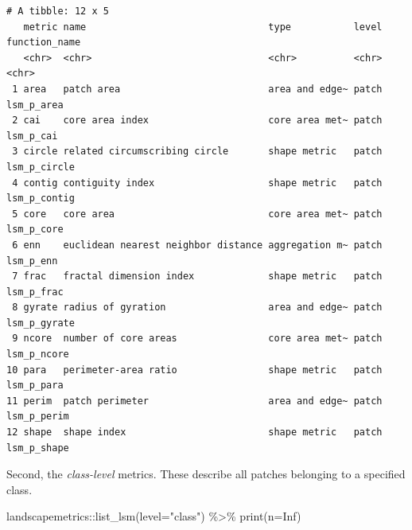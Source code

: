 \documentclass[
  letterpaper,
  DIV=11,
  numbers=noendperiod]{scrartcl}
\newenvironment{Shaded}{\begin{snugshade}}{\end{snugshade}}
\newcommand{\AttributeTok}[1]{\textcolor[rgb]{0.40,0.45,0.13}{#1}}
\newcommand{\ConstantTok}[1]{\textcolor[rgb]{0.56,0.35,0.01}{#1}}
\newcommand{\FunctionTok}[1]{\textcolor[rgb]{0.28,0.35,0.67}{#1}}
\newcommand{\NormalTok}[1]{\textcolor[rgb]{0.00,0.23,0.31}{#1}}
\newcommand{\SpecialCharTok}[1]{\textcolor[rgb]{0.37,0.37,0.37}{#1}}
\newcommand{\StringTok}[1]{\textcolor[rgb]{0.13,0.47,0.30}{#1}}
\begin{document}
\begin{verbatim}
# A tibble: 12 x 5
   metric name                                type           level function_name
   <chr>  <chr>                               <chr>          <chr> <chr>        
 1 area   patch area                          area and edge~ patch lsm_p_area   
 2 cai    core area index                     core area met~ patch lsm_p_cai    
 3 circle related circumscribing circle       shape metric   patch lsm_p_circle 
 4 contig contiguity index                    shape metric   patch lsm_p_contig 
 5 core   core area                           core area met~ patch lsm_p_core   
 6 enn    euclidean nearest neighbor distance aggregation m~ patch lsm_p_enn    
 7 frac   fractal dimension index             shape metric   patch lsm_p_frac   
 8 gyrate radius of gyration                  area and edge~ patch lsm_p_gyrate 
 9 ncore  number of core areas                core area met~ patch lsm_p_ncore  
10 para   perimeter-area ratio                shape metric   patch lsm_p_para   
11 perim  patch perimeter                     area and edge~ patch lsm_p_perim  
12 shape  shape index                         shape metric   patch lsm_p_shape  
\end{verbatim}

Second, the \emph{class-level} metrics. These describe all patches
belonging to a specified class.

\begin{Shaded}
\begin{Highlighting}[]
\NormalTok{landscapemetrics}\SpecialCharTok{::}\FunctionTok{list\_lsm}\NormalTok{(}\AttributeTok{level=}\StringTok{"class"}\NormalTok{) }\SpecialCharTok{\%\textgreater{}\%} \FunctionTok{print}\NormalTok{(}\AttributeTok{n=}\ConstantTok{Inf}\NormalTok{)}
\end{Highlighting}
\end{Shaded}
\end{document}

